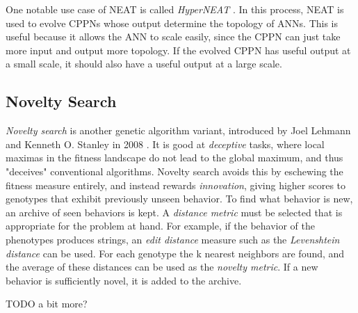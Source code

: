 One notable use case of NEAT is called \textit{HyperNEAT} \cite{stanley2009hypercube}.
In this process, NEAT is used to evolve CPPNs whose output determine the topology of ANNs.
This is useful because it allows the ANN to scale easily, since the CPPN can just take more input and output more topology.
If the evolved CPPN has useful output at a small scale, it should also have a useful output at a large scale.

\subsection{Novelty Search}
\textit{Novelty search} is another genetic algorithm variant, introduced by Joel Lehmann and Kenneth O. Stanley in 2008 \cite{lehman-2008}.
It is good at \textit{deceptive} tasks, where local maximas in the fitness landscape do not lead to the global maximum, and thus "deceives" conventional algorithms.
Novelty search avoids this by eschewing the fitness measure entirely, and instead rewards \textit{innovation}, giving higher scores to genotypes that exhibit previously unseen behavior.
To find what behavior is new, an archive of seen behaviors is kept.
A \textit{distance metric} must be selected that is appropriate for the problem at hand.
For example, if the behavior of the phenotypes produces strings, an \textit{edit distance} measure such as the \textit{Levenshtein distance} can be used.
For each genotype the k nearest neighbors are found, and the average of these distances can be used as the \textit{novelty metric}.
If a new behavior is sufficiently novel, it is added to the archive.

TODO a bit more?

